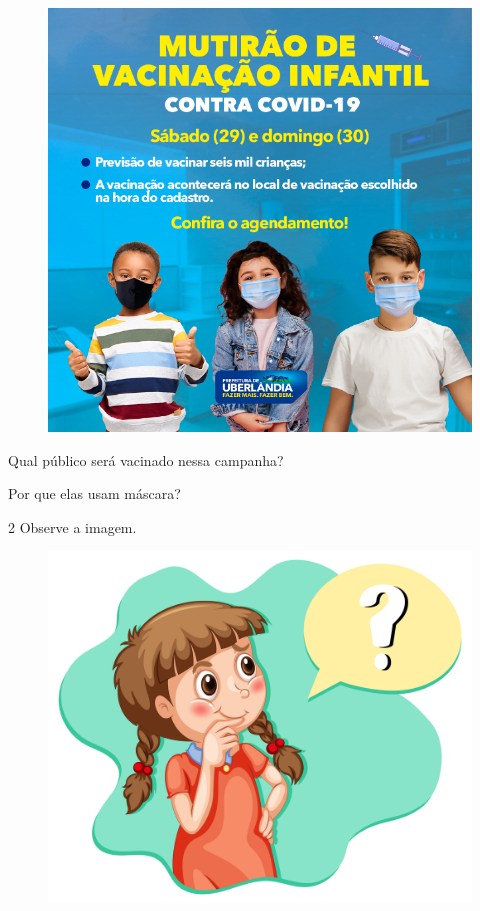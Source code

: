 \begin{figure}[H]
\centering
\includegraphics[width=.8\textwidth]{media/image128.png}
\end{figure}


\begin{escolha}
\item Qual público será vacinado nessa campanha?\\

\item Por que elas usam máscara?\\
\end{escolha}

\num{2} Observe a imagem.

\begin{figure}[H]
\centering
\includegraphics[width=.5\textwidth]{media/image205.jpg}
\end{figure}

